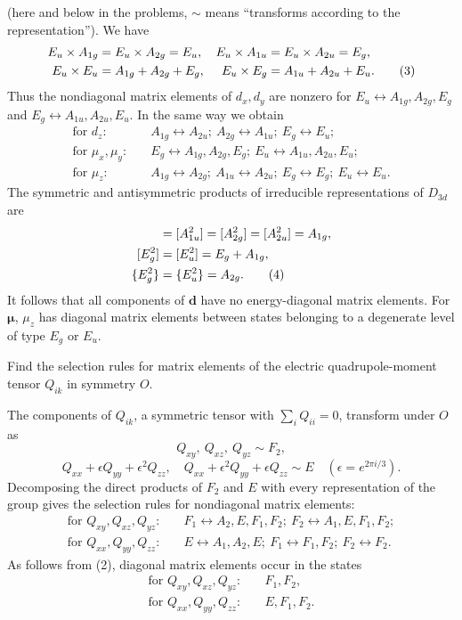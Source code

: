 (here and below in the problems, $\sim$ means ``transforms according to the representation''). We have
\begin{align}
 E_u\times A_{1g}&=E_u\times A_{2g}=E_u,&E_u\times A_{1u}&=E_u\times A_{2u}=E_g,\notag\\
 E_u\times E_u&=A_{1g}+A_{2g}+E_g,&E_u\times E_g&=A_{1u}+A_{2u}+E_u.\tag{3}
\end{align}
Thus the nondiagonal matrix elements of $d_x,d_y$ are nonzero for $E_u\leftrightarrow A_{1g},A_{2g},E_g$ and $E_g\leftrightarrow A_{1u},A_{2u},E_u$. In the same way we obtain
\begin{align*}
 \text{for }d_z:\quad&A_{1g}\leftrightarrow A_{2u};\ A_{2g}\leftrightarrow A_{1u};\ E_g\leftrightarrow E_u;\\
 \text{for }\mu_x,\mu_y:\quad&E_g\leftrightarrow A_{1g},A_{2g},E_g;\ E_u\leftrightarrow A_{1u},A_{2u},E_u;\\
 \text{for }\mu_z:\quad&A_{1g}\leftrightarrow A_{2g};\ A_{1u}\leftrightarrow A_{2u};\ E_g\leftrightarrow E_g;\ E_u\leftrightarrow E_u.
\end{align*}
The symmetric and antisymmetric products of irreducible representations of $D_{3d}$ are
\begin{align}
 [A_{1g}^2]&=[A_{1u}^2]=[A_{2g}^2]=[A_{2u}^2]=A_{1g},\notag\\
 [E_g^2]&=[E_u^2]=E_g+A_{1g},\notag\\
 \{E_g^2\}&=\{E_u^2\}=A_{2g}.\tag{4}
\end{align}
It follows that all components of $\mathbf d$ have no energy-diagonal matrix elements. For $\boldsymbol\mu$, $\mu_z$ has diagonal matrix elements between states belonging to a degenerate level of type $E_g$ or $E_u$.

 Find the selection rules for matrix elements of the electric quadrupole-moment tensor $Q_{ik}$ in symmetry $O$.

\SolutionHeading The components of $Q_{ik}$, a symmetric tensor with $\sum_iQ_{ii}=0$, transform under $O$ as
\[
 Q_{xy},\ Q_{xz},\ Q_{yz}\sim F_2,
\]
\[
 Q_{xx}+\epsilon Q_{yy}+\epsilon^2Q_{zz},\quad Q_{xx}+\epsilon^2Q_{yy}+\epsilon Q_{zz}\sim E
 \quad(\epsilon=e^{2\pi i/3}).
\]
Decomposing the direct products of $F_2$ and $E$ with every representation of the group gives the selection rules for nondiagonal matrix elements:
\begin{align*}
 \text{for }Q_{xy},Q_{xz},Q_{yz}:&\quad F_1\leftrightarrow A_2,E,F_1,F_2;\ F_2\leftrightarrow A_1,E,F_1,F_2;\\
 \text{for }Q_{xx},Q_{yy},Q_{zz}:&\quad E\leftrightarrow A_1,A_2,E;\ F_1\leftrightarrow F_1,F_2;\ F_2\leftrightarrow F_2.
\end{align*}
As follows from (2), diagonal matrix elements occur in the states
\begin{align*}
 \text{for }Q_{xy},Q_{xz},Q_{yz}:&\quad F_1,F_2,\\
 \text{for }Q_{xx},Q_{yy},Q_{zz}:&\quad E,F_1,F_2.
\end{align*}

